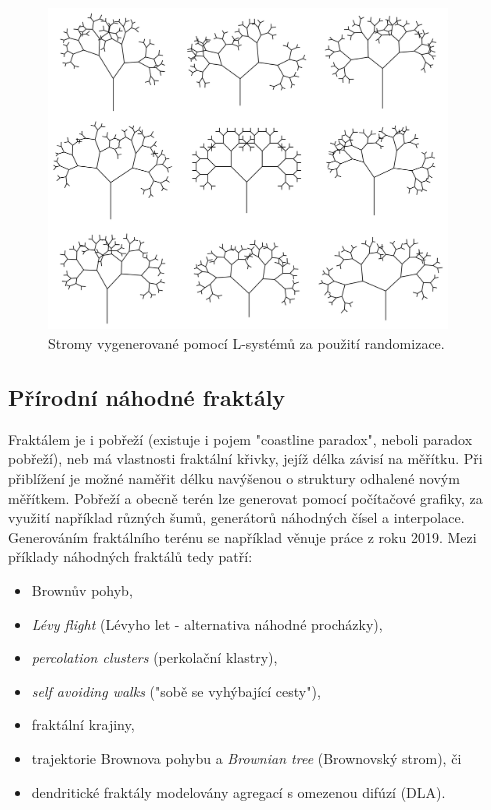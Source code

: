 \documentclass[thesis=B, czech]{FITthesis}[2019/03/06]
\begin{document}
\begin{figure}[h]
    \centering
    \includegraphics[width=300pt]{images/lsysRand.png}
        \caption{Stromy vygenerované pomocí L-systémů za použití randomizace.}
        \label{fig:lsysRand}
\end{figure}

\subsection*{Přírodní náhodné fraktály}



Fraktálem je i pobřeží (existuje i pojem "coastline paradox", neboli paradox pobřeží), neb má vlastnosti fraktální křivky, jejíž délka závisí na měřítku. Při přiblížení je možné naměřit délku navýšenou o struktury odhalené novým měřítkem. Pobřeží a obecně terén lze generovat pomocí počítačové grafiky, za využití například různých šumů, generátorů náhodných čísel a interpolace. Generováním fraktálního terénu se například věnuje práce \cite{kriz2019} z roku 2019. Mezi příklady náhodných fraktálů tedy patří:

\newpage

\begin{itemize}
  \item Brownův pohyb,
  \item \textit{Lévy flight} (Lévyho let - alternativa náhodné procházky),
  \item \textit{percolation clusters} (perkolační klastry),
  \item \textit{self avoiding walks} ("sobě se vyhýbající cesty"),
  \item fraktální krajiny,
  \item trajektorie Brownova pohybu a \textit{Brownian tree} (Brownovský strom), či
  \item dendritické fraktály modelovány agregací s omezenou difúzí (DLA).
\end{itemize}
\end{document}
